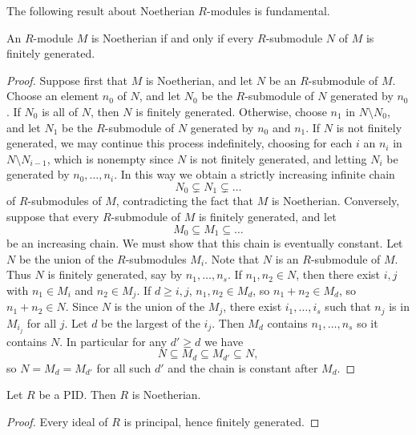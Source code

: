 The following result about Noetherian $ R $-modules is fundamental.

\begin{theorem}
An $ R $-module $ M $ is Noetherian if and only if every $ R $-submodule $ N $ of $ M $ is finitely generated.
\end{theorem}

\begin{proof}
Suppose first that $ M $ is Noetherian, and let $ N $ be an $ R $-submodule of $ M $. Choose an element $ n_0 $ of $ N $, and let $ N_0 $ be the $ R $-submodule of $ N $ generated by $ n_0 $. If $ N_0 $ is all of $ N $, then $ N $ is finitely generated. Otherwise, choose $ n_1 $ in $ N \setminus N_0 $, and let $ N_1 $ be the $ R $-submodule of $ N $ generated by $ n_0 $ and $ n_1 $. If $ N $ is not finitely generated, we may continue this process indefinitely, choosing for each $ i $ an $ n_i $ in $ N \setminus N_{i - 1} $, which is nonempty since $ N $ is not finitely generated, and letting $ N_i $ be generated by $ n_0, \dots, n_i $. In this way we obtain a strictly increasing infinite chain
$$ N_0 \subsetneq N_1 \subsetneq \dots $$
of $ R $-submodules of $ M $, contradicting the fact that $ M $ is Noetherian. Conversely, suppose that every $ R $-submodule of $ M $ is finitely generated, and let
$$ M_0 \subseteq M_1 \subseteq \dots $$
be an increasing chain. We must show that this chain is eventually constant. Let $ N $ be the union of the $ R $-submodules $ M_i $. Note that $ N $ is an $ R $-submodule of $ M $. Thus $ N $ is finitely generated, say by $ n_1, \dots, n_s $. If $ n_1, n_2 \in N $, then there exist $ i, j $ with $ n_1 \in M_i $ and $ n_2 \in M_j $. If $ d \ge i, j $, $ n_1, n_2 \in M_d $, so $ n_1 + n_2 \in M_d $, so $ n_1 + n_2 \in N $. Since $ N $ is the union of the $ M_j $, there exist $ i_1, \dots, i_s $ such that $ n_j $ is in $ M_{i_j} $ for all $ j $. Let $ d $ be the largest of the $ i_j $. Then $ M_d $ contains $ n_1, \dots, n_s $ so it contains $ N $. In particular for any $ d' \ge d $ we have
$$ N \subseteq M_d \subseteq M_{d'} \subseteq N, $$
so $ N = M_d = M_{d'} $ for all such $ d' $ and the chain is constant after $ M_d $.
\end{proof}


\begin{corollary}
Let $ R $ be a PID. Then $ R $ is Noetherian.
\end{corollary}

\begin{proof}
Every ideal of $ R $ is principal, hence finitely generated.
\end{proof}

